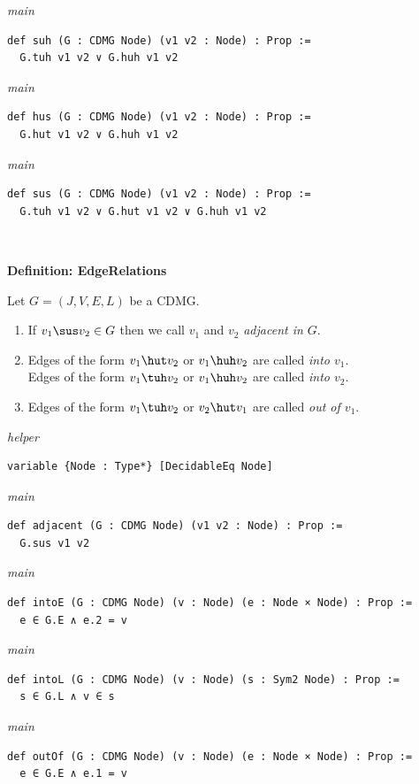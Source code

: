 {\small\textit{main}}
\begin{verbatim}
def suh (G : CDMG Node) (v1 v2 : Node) : Prop :=
  G.tuh v1 v2 ∨ G.huh v1 v2
\end{verbatim}
{\small\textit{main}}
\begin{verbatim}
def hus (G : CDMG Node) (v1 v2 : Node) : Prop :=
  G.hut v1 v2 ∨ G.huh v1 v2
\end{verbatim}
{\small\textit{main}}
\begin{verbatim}
def sus (G : CDMG Node) (v1 v2 : Node) : Prop :=
  G.tuh v1 v2 ∨ G.hut v1 v2 ∨ G.huh v1 v2
\end{verbatim}
~%

\vspace{\appendixNotesGap}

\noindent\textbf{Definition: EdgeRelations}\par\smallskip
{\appendixTexSize
  Let $G=(J,V,E,L)$ be a CDMG.
  \begin{enumerate}
    \item If $v_1 \sus v_2 \in G$ then we call $v_1$ and $v_2$ \emph{adjacent in $G$}.
    \item Edges of the form $v_1 \hut v_2$ or $v_1 \huh v_2$ are called \emph{into $v_1$}.  \\
          Edges of the form $v_1 \tuh v_2$ or $v_1 \huh v_2$ are called \emph{into $v_2$}. 
    \item Edges of the form $v_1 \tuh v_2$ or $v_2 \hut v_1$ are called \emph{out of $v_1$}.
  \end{enumerate}
\par}
\smallskip
{\small\textit{helper}}
\begin{verbatim}
variable {Node : Type*} [DecidableEq Node]
\end{verbatim}
{\small\textit{main}}
\begin{verbatim}
def adjacent (G : CDMG Node) (v1 v2 : Node) : Prop :=
  G.sus v1 v2
\end{verbatim}
{\small\textit{main}}
\begin{verbatim}
def intoE (G : CDMG Node) (v : Node) (e : Node × Node) : Prop :=
  e ∈ G.E ∧ e.2 = v
\end{verbatim}
{\small\textit{main}}
\begin{verbatim}
def intoL (G : CDMG Node) (v : Node) (s : Sym2 Node) : Prop :=
  s ∈ G.L ∧ v ∈ s
\end{verbatim}
{\small\textit{main}}
\begin{verbatim}
def outOf (G : CDMG Node) (v : Node) (e : Node × Node) : Prop :=
  e ∈ G.E ∧ e.1 = v
\end{verbatim}
~%

